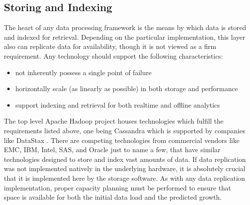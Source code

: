 \subsection{Storing and Indexing}
 The heart of any data processing framework is the means by which data is stored and indexed for retrieval. Depending on the particular implementation, this layer also can replicate data for availability, though it is not viewed as a firm requirement. Any technology should support the following characteristics:
\begin{itemize}
	\item not inherently possess a single point of failure
	\item horizontally scale (as linearly as possible) in both storage and performance
	\item support indexing and retrieval for both realtime and offline analytics
\end{itemize}
The top level Apache Hadoop project houses technologies which fulfill the requirements listed above, one being Cassandra which is supported by companies like DataStax \cite{cassandra}. There are competing technologies from commercial vendors like EMC, IBM, Intel, SAS, and Oracle just to name a few, that have similar technologies designed to store and index vast amounts of data. If data replication was not implemented natively in the underlying hardware, it is absolutely crucial that it is implemented here by the storage software. As with any data replication implementation, proper capacity planning must be performed to ensure that space is available for both the initial data load and the predicted growth.\\

